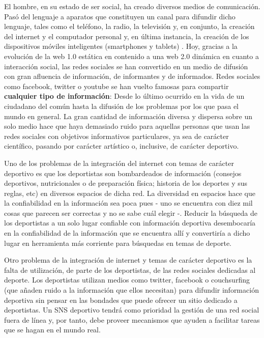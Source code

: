 El hombre, en su estado de ser social, ha creado diversos medios de comunicación. Pasó del lenguaje a aparatos que constituyen un canal
para difundir dicho lenguaje, tales como el teléfono, la radio, la televisión y, en conjunto, la creación del internet y el computador personal y,
en última instancia, la creación de los dispositivos móviles inteligentes (smartphones y tablets) . Hoy, gracias a la evolución de la web 1.0
estática en contenido a una web 2.0 dinámica en cuanto a interacción social, las redes sociales se han convertido en un medio de difusión con
gran afluencia de información, de informantes y de informados. Redes sociales como facebook, twitter o youtube se han vuelto famosas para
compartir \textbf{cualquier tipo de información}: Desde lo último ocurrido en la vida de un ciudadano del común hasta la difusión de los
problemas por los que pasa el mundo en general. La gran cantidad de información diversa y dispersa sobre un solo medio hace que haya
demasiado ruido para aquellas personas que usan las redes sociales con objetivos informativos particulares, ya sea de carácter científico,
pasando por carácter artístico o, inclusive, de carácter deportivo.

Uno de los problemas de la integración del internet con temas de carácter deportivo es que los deportistas son bombardeados de información
(consejos deportivos, nutricionales o de preparación física; historia de los deportes y sus reglas, etc) en diversos espacios de dicha red. La
diversidad en espacios hace que la confiabilidad en la información sea poca pues - uno se encuentra con diez mil cosas que parecen ser
correctas y no se sabe cuál elegir -. Reducir la búsqueda de los deportistas a un solo lugar confiable con información deportiva desembocaría
en la confiabilidad de la información que se encuentra allí y convertiría a dicho lugar en herramienta más corriente para búsquedas en temas
de deporte.

Otro problema de la integración de internet y temas de carácter deportivo es la falta de utilización, de parte de los deportistas, de las redes
sociales dedicadas al deporte. Los deportistas utilizan medios como twitter, facebook o couchsurfing (que añaden ruido a la información que
ellos necesitan) para difundir información deportiva sin pensar en las bondades que puede ofrecer un sitio dedicado a deportistas. Un SNS
deportivo tendrá como prioridad la gestión de una red social fuera de línea y, por tanto, debe proveer mecanismos que ayuden a facilitar
tareas que se hagan en el mundo real.

